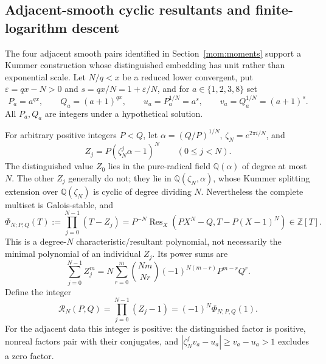 \documentclass[11pt,oneside]{article}
\theoremstyle{definition}
\theoremstyle{remark}
\newcommand{\Z}{\mathbb Z}
\newcommand{\Q}{\mathbb Q}
\begin{document}
\subsection{Adjacent-smooth cyclic resultants and finite-logarithm descent}
\label{crit:adjacent-resultants}

The four adjacent smooth pairs identified in Section~\ref{mom:moments} support a Kummer
construction whose distinguished embedding has unit rather than
exponential scale.  Let $N/q<x$ be a reduced lower convergent, put
$\varepsilon=qx-N>0$ and $s=qx/N=1+\varepsilon/N$, and for
$a\in\{1,2,3,8\}$ set
\[
 P_a=a^{qx},\qquad Q_a=(a+1)^{qx},\qquad
 u_a=P_a^{1/N}=a^s,\qquad v_a=Q_a^{1/N}=(a+1)^s.
\]
All $P_a,Q_a$ are integers under a hypothetical solution.

For arbitrary positive integers $P<Q$, let
$\alpha=(Q/P)^{1/N}$, $\zeta_N=e^{2\pi i/N}$, and
\[
 Z_j=P(\zeta_N^j\alpha-1)^N\qquad(0\le j<N).
\]
The distinguished value $Z_0$ lies in the pure-radical field $\Q(\alpha)$ of degree at most
$N$.  The other $Z_j$ generally do not; they lie in
$\Q(\zeta_N,\alpha)$, whose Kummer splitting extension over $\Q(\zeta_N)$ is cyclic of
degree dividing $N$.  Nevertheless the complete multiset is Galois-stable, and
\begin{equation}
 \Phi_{N;P,Q}(T)
 :=\prod_{j=0}^{N-1}(T-Z_j)
 =P^{-N}\operatorname{Res}_X(PX^N-Q,T-P(X-1)^N)
 \in\Z[T].
 \label{crit:eq-adjacent-universal-polynomial}
\end{equation}
This is a degree-$N$ characteristic/resultant polynomial, not necessarily the minimal
polynomial of an individual $Z_j$.  Its power sums are
\begin{equation}
 \sum_{j=0}^{N-1}Z_j^m
 =N\sum_{r=0}^{m}\binom{Nm}{Nr}
   (-1)^{N(m-r)}P^{m-r}Q^r.
 \label{crit:eq-adjacent-power-sums}
\end{equation}
Define the integer
\begin{equation}
 \mathcal R_N(P,Q)=\prod_{j=0}^{N-1}(Z_j-1)
 =(-1)^N\Phi_{N;P,Q}(1).
 \label{crit:eq-cyclic-catalan-resultant}
\end{equation}
For the adjacent data this integer is positive: the distinguished factor is positive,
nonreal factors pair with their conjugates, and
$|\zeta_N^jv_a-u_a|\ge v_a-u_a>1$ excludes a zero factor.
\end{document}
